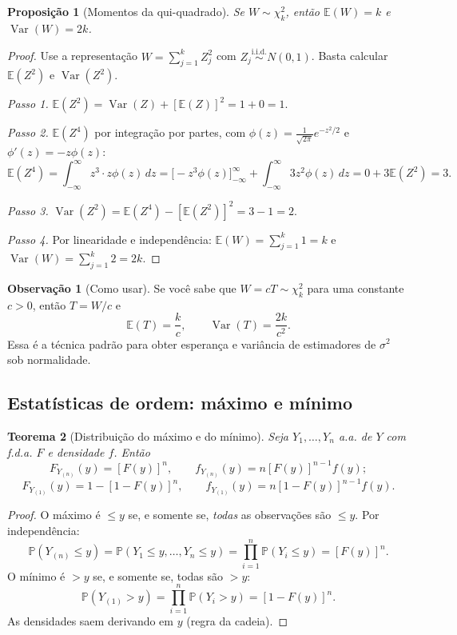 \documentclass[11pt,a4paper]{article}
\theoremstyle{definition}
\newtheorem{observacao}{Observação}[section]
\theoremstyle{plain}
\newtheorem{teorema}{Teorema}[section]
\newtheorem{proposicao}[teorema]{Proposição}
\newcommand{\E}{\mathbb{E}}
\newcommand{\Var}{\operatorname{Var}}
\newcommand{\Prob}{\mathbb{P}}
\newcommand{\iid}{\overset{\text{i.i.d.}}{\sim}}
\begin{document}
\begin{proposicao}[Momentos da qui-quadrado]\label{prop:chi}
Se $W\sim\chi^2_k$, então $\E(W)=k$ e $\Var(W)=2k$.
\end{proposicao}
\begin{proof}
Use a representação $W=\sum_{j=1}^k Z_j^2$ com $Z_j\iid N(0,1)$. Basta calcular $\E(Z^2)$ e $\Var(Z^2)$.

\textit{Passo 1.} $\E(Z^2)=\Var(Z)+[\E(Z)]^2 = 1+0 = 1$.

\textit{Passo 2.} $\E(Z^4)$ por integração por partes, com $\phi(z)=\frac{1}{\sqrt{2\pi}}e^{-z^2/2}$ e $\phi'(z)=-z\phi(z)$:
\[
\E(Z^4)=\int_{-\infty}^{\infty} z^3\cdot z\phi(z)\,dz
=\Big[-z^3\phi(z)\Big]_{-\infty}^{\infty}+\int_{-\infty}^{\infty} 3z^2\phi(z)\,dz
=0+3\E(Z^2)=3 .
\]

\textit{Passo 3.} $\Var(Z^2)=\E(Z^4)-[\E(Z^2)]^2=3-1=2$.

\textit{Passo 4.} Por linearidade e independência:
$\E(W)=\sum_{j=1}^k 1 = k$ e $\Var(W)=\sum_{j=1}^k 2=2k$.
\end{proof}

\begin{observacao}[Como usar]
Se você sabe que $W = cT \sim \chi^2_k$ para uma constante $c>0$, então $T=W/c$ e
\[
\E(T)=\frac{k}{c}, \qquad \Var(T)=\frac{2k}{c^2}.
\]
Essa é a técnica padrão para obter esperança e variância de estimadores de $\sigma^2$ sob normalidade.
\end{observacao}

\subsection{Estatísticas de ordem: máximo e mínimo}

\begin{teorema}[Distribuição do máximo e do mínimo]\label{teo:ordem}
Seja $Y_1,\dots,Y_n$ a.a. de $Y$ com f.d.a. $F$ e densidade $f$. Então
\[
F_{Y_{(n)}}(y)=[F(y)]^n, \qquad f_{Y_{(n)}}(y)=n[F(y)]^{n-1}f(y);
\]
\[
F_{Y_{(1)}}(y)=1-[1-F(y)]^n, \qquad f_{Y_{(1)}}(y)=n[1-F(y)]^{n-1}f(y).
\]
\end{teorema}
\begin{proof}
O máximo é $\le y$ se, e somente se, \emph{todas} as observações são $\le y$. Por independência:
\[
\Prob(Y_{(n)}\le y)=\Prob(Y_1\le y,\dots,Y_n\le y)=\prod_{i=1}^n\Prob(Y_i\le y)=[F(y)]^n .
\]
O mínimo é $>y$ se, e somente se, todas são $>y$:
\[
\Prob(Y_{(1)}>y)=\prod_{i=1}^n\Prob(Y_i>y)=[1-F(y)]^n .
\]
As densidades saem derivando em $y$ (regra da cadeia).
\end{proof}
\end{document}
